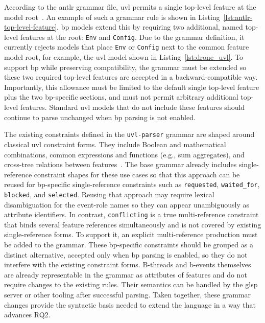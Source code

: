 According to the \gls{antlr} grammar file, \gls{uvl} permits a single top-level feature at the model root~\cite{noauthor_universal-variability-languageuvl-parser_2026}.
An example of such a grammar rule is shown in Listing~\ref{lst:antlr-top-level-feature}.
\gls{bp} models extend this by requiring two additional, named top-level features at the root: \texttt{Env} and \texttt{Config}.
Due to the grammar definition, it currently rejects models that place \texttt{Env} or \texttt{Config} next to the common feature model root, for example, the \gls{uvl} model shown in Listing~\ref{lst:drone_uvl}.
To support \gls{bp} while preserving compatibility, the grammar must be extended so these two required top-level features are accepted in a backward-compatible way.
Importantly, this allowance must be limited to the default single top-level feature plus the two \gls{bp}-specific sections, and must not permit arbitrary additional top-level features.
Standard \gls{uvl} models that do not include these features should continue to parse unchanged when \gls{bp} parsing is not enabled.



The existing constraints defined in the \texttt{uvl-parser} grammar are shaped around classical \gls{uvl} constraint forms.
They include Boolean and mathematical combinations, common expressions and functions (e.g., sum aggregates), and cross-tree relations between features~\cite{noauthor_universal-variability-languageuvl-parser_2026}.
The base grammar already includes single-reference constraint shapes for these use cases so that this approach can be reused for \gls{bp}-specific single-reference constraints such as \texttt{requested}, \texttt{waited\_for}, \texttt{blocked}, and \texttt{selected}.
Reusing that approach may require lexical disambiguation for the event-role names so they can appear unambiguously as attribute identifiers.
In contrast, \texttt{conflicting} is a true multi-reference constraint that binds several feature references simultaneously and is not covered by existing single-reference forms.
To support it, an explicit multi-reference production must be added to the grammar.
These \gls{bp}-specific constraints should be grouped as a distinct alternative, accepted only when \gls{bp} parsing is enabled, so they do not interfere with the existing constraint forms.
B-threads and b-events themselves are already representable in the grammar as attributes of features and do not require changes to the existing rules.
Their semantics can be handled by the \gls{glsp} server or other tooling after successful parsing.
Taken together, these grammar changes provide the syntactic basis needed to extend the language in a way that advances RQ2.

